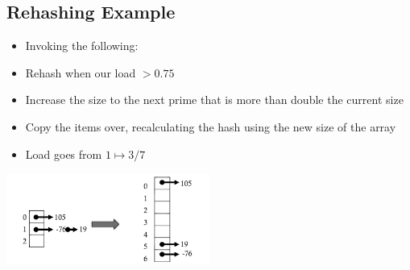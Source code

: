 \documentclass[10pt]{article}
\begin{document}
\subsection*{Rehashing Example}
\begin{itemize}
    \item Invoking the following:
    \item Rehash when our load $> 0.75$
    \item Increase the size to the next prime that is more than double the current size
    \item Copy the items over, recalculating the hash using the new size of the array
    \item Load goes from $1\mapsto 3/7$
\end{itemize}
\begin{center}
    \includegraphics[width=0.5\textwidth]{images/1.png}    
\end{center}
\end{document}
